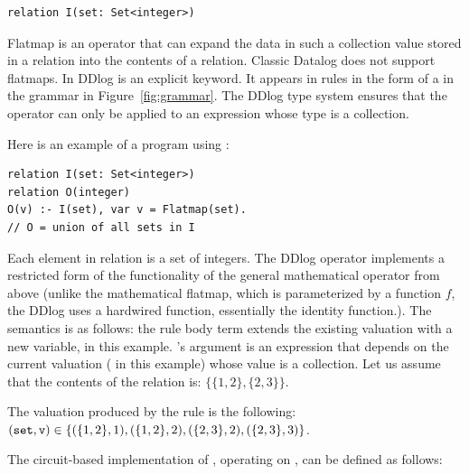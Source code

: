\begin{lstlisting}[language=ddlog]
relation I(set: Set<integer>)
\end{lstlisting}

Flatmap is an operator that can expand the data in such a collection value
stored in a relation into the contents of a relation.  Classic Datalog does not support flatmaps. 
In DDlog  is an explicit keyword.  It appears
in rules in the form of a  in 
the grammar in Figure~\ref{fig:grammar}.  The DDlog type system ensures that the  
operator can only be applied to an expression whose type is a collection.

Here is an example of a program using :

\begin{lstlisting}[language=ddlog]
relation I(set: Set<integer>)
relation O(integer)
O(v) :- I(set), var v = Flatmap(set).
// O = union of all sets in I
\end{lstlisting}

Each element in relation  is a set of integers.  
The DDlog  operator implements a restricted form of
the functionality of the general mathematical operator from above 
(unlike the mathematical flatmap, which is parameterized by a function $f$, the DDlog
 uses a hardwired function, essentially the identity function.).  
The semantics is as follows: the  rule body term extends the existing valuation
with a new variable,  in this example.  's argument is
an expression that depends on the current valuation ( in this example)
whose value is a collection.  Let us assume that the contents of the  relation is: 
$\{ \{1,2\}, \{2,3\} \}$.  

The valuation produced by the rule  is
the following: $(\mbox{\texttt{set}}, \mbox{\texttt{v}}) \in  \{ (\{1,2\}, 1), (\{1,2\}, 2), 
(\{2,3\}, 2), (\{2,3\}, 3) \}$.

The circuit-based implementation of , operating on \zrs, can be
defined as follows:


